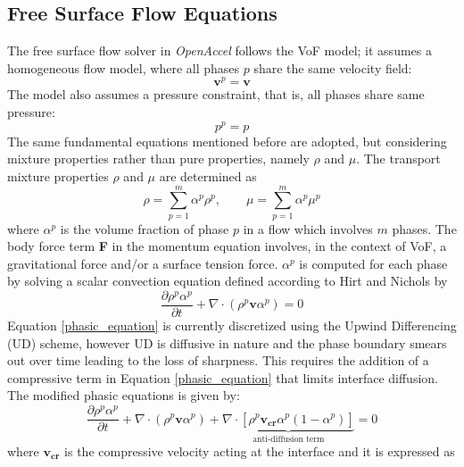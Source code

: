 \documentclass[12pt]{extarticle}
\newcommand{\<}{\langle}
\renewcommand{\>}{\rangle}
\theoremstyle{definition}
\begin{document}
\subsection{Free Surface Flow Equations}
The free surface flow solver in \textit{OpenAccel} follows the VoF model; it assumes a homogeneous flow model, where all phases $p$ share the same velocity field:
\begin{equation}
    \textbf{v}^p = \textbf{v}
\end{equation}
The model also assumes a pressure constraint, that is, all phases share same pressure:
\begin{equation}
    p^p = p
\end{equation}
The same fundamental equations mentioned before are adopted, but considering mixture properties rather than pure properties, namely $\rho$ and $\mu$. The transport mixture properties $\rho$ and $\mu$ are determined as
\begin{equation}\label{mixture-rho}
\rho = \sum\limits_{p=1}^{m} \alpha^{p} \rho^{p},\qquad \mu = \sum\limits_{p=1}^{m} \alpha^{p} \mu^{p}
\end{equation}
where $\alpha^{p}$ is the volume fraction of phase $p$ in a flow which involves $m$ phases. The body force term \textbf{F} in the momentum equation involves, in the context of VoF, a gravitational force and/or a surface tension force. $\alpha^{p}$ is computed for each phase by solving a scalar convection equation defined according to Hirt and Nichols \cite{hirt1981volume} by
\begin{equation}\label{phasic_equation}
\frac{\partial \rho^{p} \alpha^{p}}{\partial t} + \nabla\cdot (\rho^{p}\textbf{v}\alpha^{p}) = 0
\end{equation}
Equation \ref{phasic_equation} is currently discretized using the Upwind Differencing (UD) scheme, however UD is diffusive in nature and the phase boundary smears out over time leading to the loss of sharpness. This requires the addition of a compressive term in Equation \ref{phasic_equation} that limits interface diffusion. The modified phasic equations is given by:
\begin{equation}\label{phasic_equation_compress}
    \frac{\partial \rho^{p} \alpha^{p}}{\partial t} + \nabla\cdot (\rho^{p}\textbf{v}\alpha^{p}) + \underbrace{\nabla \cdot \left[\rho^p\mathbf{v_{cr}}\alpha^p(1-\alpha^p)\right]}_{\text{anti-diffusion term}}= 0
\end{equation}
where $\mathbf{v_{cr}}$ is the compressive velocity acting at the interface and it is expressed as
\end{document}
